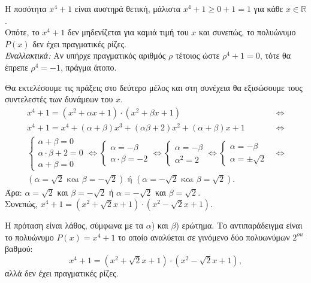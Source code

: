 \begin{alist}
\item Η ποσότητα $x^4 + 1$ είναι αυστηρά θετική, μάλιστα $x^4 + 1 \ge 0 + 1 = 1$ για κάθε $x \in \mathbb{R}$. \\
Οπότε, το $x^4 + 1$ δεν μηδενίζεται για καμιά τιμή του $x$ και συνεπώς, το πολυώνυμο $P(x)$ δεν έχει πραγματικές ρίζες. \\
\textit{Εναλλακτικά:} Αν υπήρχε πραγματικός αριθμός $\rho$ τέτοιος ώστε $\rho^4 + 1 = 0$, τότε θα έπρεπε $\rho^4 = -1$, πράγμα άτοπο.
\item Θα εκτελέσουμε τις πράξεις στο δεύτερο μέλος και στη συνέχεια θα εξισώσουμε τους συντελεστές των δυνάμεων του $x$.
\begin{align*}
x^4 + 1 = (x^2 + \alpha x + 1) \cdot (x^2 + \beta x + 1) &\Leftrightarrow \\
x^4 + 1 = x^4 + (\alpha + \beta)x^3 + (\alpha\beta + 2)x^2 + (\alpha + \beta)x + 1 &\Leftrightarrow \\
\begin{cases} \alpha + \beta = 0 \\ \alpha \cdot \beta + 2 = 0 \\ \alpha + \beta = 0 \end{cases} \Leftrightarrow \begin{cases} \alpha = -\beta \\ \alpha \cdot \beta = -2 \end{cases} \Leftrightarrow \begin{cases} \alpha = -\beta \\ \alpha^2 = 2 \end{cases} \Leftrightarrow \begin{cases} \alpha = -\beta \\ \alpha = \pm \sqrt{2} \end{cases} &\Leftrightarrow \\
(\alpha = \sqrt{2} \text{ και } \beta = -\sqrt{2}) \text{ ή } (\alpha = -\sqrt{2} \text{ και } \beta = \sqrt{2}). &
\end{align*}
Άρα: $\alpha = \sqrt{2}$ και $\beta = -\sqrt{2}$ ή $\alpha = -\sqrt{2}$ και $\beta = \sqrt{2}$. \\
Συνεπώς, $x^4 + 1 = (x^2 + \sqrt{2}x + 1) \cdot (x^2 - \sqrt{2}x + 1)$.
\item Η πρόταση είναι λάθος, σύμφωνα με τα $\alpha$) και $\beta$) ερώτημα. Το αντιπαράδειγμα είναι το πολυώνυμο $P(x) = x^4 + 1$ το οποίο αναλύεται σε γινόμενο δύο πολυωνύμων $2^{ou}$ βαθμού:
\[x^4 + 1 = (x^2 + \sqrt{2}x + 1) \cdot (x^2 - \sqrt{2}x + 1),\]
αλλά δεν έχει πραγματικές ρίζες.
\end{alist}

